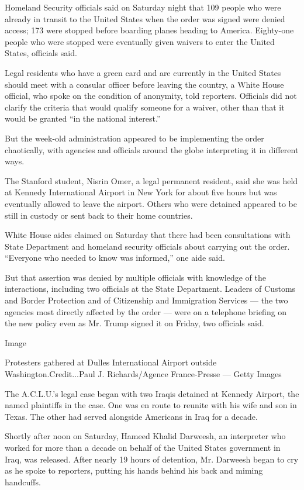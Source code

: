 Homeland Security officials said on Saturday night that 109 people who
were already in transit to the United States when the order was signed
were denied access; 173 were stopped before boarding planes heading to
America. Eighty-one people who were stopped were eventually given
waivers to enter the United States, officials said.

Legal residents who have a green card and are currently in the United
States should meet with a consular officer before leaving the country, a
White House official, who spoke on the condition of anonymity, told
reporters. Officials did not clarify the criteria that would qualify
someone for a waiver, other than that it would be granted ``in the
national interest.''

But the week-old administration appeared to be implementing the order
chaotically, with agencies and officials around the globe interpreting
it in different ways.

The Stanford student, Nisrin Omer, a legal permanent resident, said she
was held at Kennedy International Airport in New York for about five
hours but was eventually allowed to leave the airport. Others who were
detained appeared to be still in custody or sent back to their home
countries.

White House aides claimed on Saturday that there had been consultations
with State Department and homeland security officials about carrying out
the order. ``Everyone who needed to know was informed,'' one aide said.

But that assertion was denied by multiple officials with knowledge of
the interactions, including two officials at the State Department.
Leaders of Customs and Border Protection and of Citizenship and
Immigration Services --- the two agencies most directly affected by the
order --- were on a telephone briefing on the new policy even as Mr.
Trump signed it on Friday, two officials said.

Image

Protesters gathered at Dulles International Airport outside
Washington.Credit...Paul J. Richards/Agence France-Presse --- Getty
Images

The A.C.L.U.'s legal case began with two Iraqis detained at Kennedy
Airport, the named plaintiffs in the case. One was en route to reunite
with his wife and son in Texas. The other had served alongside Americans
in Iraq for a decade.

Shortly after noon on Saturday, Hameed Khalid Darweesh, an interpreter
who worked for more than a decade on behalf of the United States
government in Iraq, was released. After nearly 19 hours of detention,
Mr. Darweesh began to cry as he spoke to reporters, putting his hands
behind his back and miming handcuffs.


